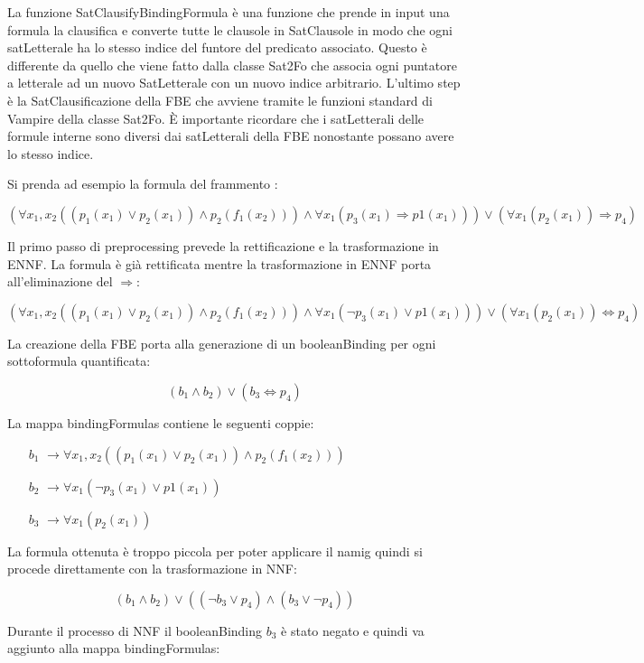 \documentclass[./main.tex]{subfiles}
\begin{document}
La funzione SatClausifyBindingFormula è una funzione che prende in input una formula
la clausifica e converte tutte le clausole in SatClausole in modo che ogni satLetterale ha lo stesso indice del funtore del predicato associato.
Questo è differente da quello che viene fatto dalla classe Sat2Fo che associa ogni puntatore a letterale ad un nuovo SatLetterale con un nuovo indice arbitrario.
L'ultimo step è la SatClausificazione della FBE che avviene tramite le funzioni standard di Vampire della classe Sat2Fo.
È importante ricordare che i satLetterali delle formule interne sono diversi dai satLetterali della FBE nonostante possano avere
lo stesso indice.

Si prenda ad esempio la formula del frammento \cb:

$$ (\forall x_1, x_2 ((p_1(x_1) \lor p_2(x_1)) \land p_2(f_1(x_2))) 
\land  \forall x_1 (p_3(x_1) \Rightarrow p1(x_1)))  
\lor (\forall x_1(p_2(x_1)) \Rightarrow p_4)
$$

Il primo passo di preprocessing prevede la rettificazione e la trasformazione in ENNF.
La formula è già rettificata mentre la trasformazione in ENNF porta all'eliminazione del $\Rightarrow$:

$$ (\forall x_1, x_2 ((p_1(x_1) \lor p_2(x_1)) \land p_2(f_1(x_2))) 
\land  \forall x_1 (\lnot p_3(x_1) \lor p1(x_1)))  
\lor (\forall x_1(p_2(x_1)) \Leftrightarrow p_4)
$$

La creazione della FBE porta alla generazione di un booleanBinding per ogni sottoformula quantificata:

$$ (b_1 
\land  b_2)  
\lor (b_3 \Leftrightarrow p_4)
$$

La mappa bindingFormulas contiene le seguenti coppie:

\begin{itemize}
    \item [$b_1$] $\rightarrow \forall x_1, x_2 ((p_1(x_1) \lor p_2(x_1)) \land p_2(f_1(x_2))) $
    \item [$b_2$] $\rightarrow \forall x_1 (\lnot p_3(x_1) \lor p1(x_1))$
    \item [$b_3$] $\rightarrow \forall x_1(p_2(x_1))$
\end{itemize}

La formula ottenuta è troppo piccola per poter applicare il namig
quindi si procede direttamente con la trasformazione in NNF:

$$ (b_1 
\land  b_2)  
\lor ((\lnot b_3 \lor p_4) \land (b_3 \lor \lnot p_4))
$$

Durante il processo di NNF il booleanBinding $b_3$ è stato negato e quindi va aggiunto alla mappa bindingFormulas:
\end{document}
